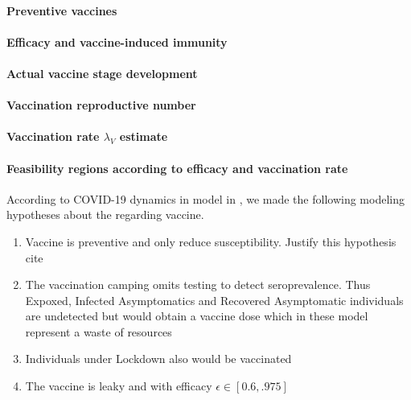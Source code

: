 \paragraph{Preventive vaccines}
\paragraph{Efficacy and vaccine-induced immunity}
\paragraph{Actual vaccine stage development}
\paragraph{Vaccination reproductive number}
\paragraph{Vaccination rate $\lambda_V$ estimate}
\paragraph{Feasibility regions according to efficacy and vaccination rate}
%
\begin{hypotheses}
     According to COVID-19 dynamics in model in , we
     made the following modeling hypotheses about the regarding vaccine.
     \begin{enumerate}[(VH-1)]
        \item
            Vaccine is preventive and only reduce susceptibility.
            Justify this hypothesis cite{}
        \item
            The vaccination camping omits testing to detect seroprevalence.
            Thus Expoxed, Infected Asymptomatics and Recovered Asymptomatic
            individuals are undetected but would obtain a vaccine dose
            \textemdash which in these model represent a waste of resources
        \item
            Individuals under Lockdown also would be vaccinated
        \item
            The vaccine is leaky and with efficacy $\epsilon \in[0.6, .975]$
     \end{enumerate}
\end{hypotheses}


